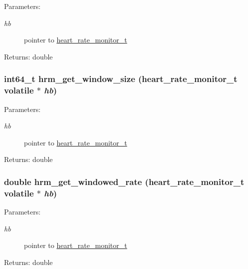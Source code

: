 \begin{Desc}
\item[Parameters:]
\begin{description}
\item[{\em hb}]pointer to \hyperlink{structheart__rate__monitor__t}{heart\_\-rate\_\-monitor\_\-t} \end{description}
\end{Desc}
\begin{Desc}
\item[Returns:]double \end{Desc}
\hypertarget{heart__rate__monitor-shared_8c_1249c1ba65c775d2701de15b4415fded}{
\subsubsection[hrm\_\-get\_\-window\_\-size]{\setlength{\rightskip}{0pt plus 5cm}int64\_\-t hrm\_\-get\_\-window\_\-size ({\bf heart\_\-rate\_\-monitor\_\-t} volatile $\ast$ {\em hb})}}
\label{heart__rate__monitor-shared_8c_1249c1ba65c775d2701de15b4415fded}


\begin{Desc}
\item[Parameters:]
\begin{description}
\item[{\em hb}]pointer to \hyperlink{structheart__rate__monitor__t}{heart\_\-rate\_\-monitor\_\-t} \end{description}
\end{Desc}
\begin{Desc}
\item[Returns:]double \end{Desc}
\hypertarget{heart__rate__monitor-shared_8c_4fb2684671956dfa63ea54ce58ac8748}{
\subsubsection[hrm\_\-get\_\-windowed\_\-rate]{\setlength{\rightskip}{0pt plus 5cm}double hrm\_\-get\_\-windowed\_\-rate ({\bf heart\_\-rate\_\-monitor\_\-t} volatile $\ast$ {\em hb})}}
\label{heart__rate__monitor-shared_8c_4fb2684671956dfa63ea54ce58ac8748}


\begin{Desc}
\item[Parameters:]
\begin{description}
\item[{\em hb}]pointer to \hyperlink{structheart__rate__monitor__t}{heart\_\-rate\_\-monitor\_\-t} \end{description}
\end{Desc}
\begin{Desc}
\item[Returns:]double \end{Desc}

